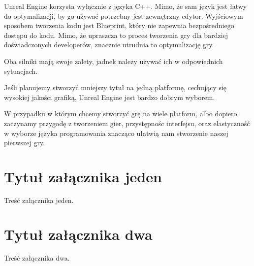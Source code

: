 \documentclass[brudnopis]{xmgr}
\begin{document}
Unreal Engine korzysta wyłącznie z języka C++. Mimo, że sam język jest łatwy do optymalizacji, by go używać potrzebny jest zewnętrzny edytor. Wyjściowym sposobem tworzenia kodu jest Blueprint, który nie zapewnia bezpośredniego dostępu do kodu. Mimo, że upraszcza to proces tworzenia gry dla bardziej doświadczonych developerów, znacznie utrudnia to optymalizację gry.

\summary
Oba silniki mają swoje zalety, jadnek należy używać ich w odpowiednich sytuacjach.

Jeśli planujemy stworzyć mniejszy tytuł na jedną platformę, cechujący się wysokiej jakości grafiką, Unreal Engine jest bardzo dobrym wyborem.

W przypadku w którym chcemy stworzyć grę na wiele platform, albo dopiero zaczynamy przygodę z tworzeniem gier, przystępnośc interfejsu, oraz elastyczność w wyborze języka programowania znacząco ułatwią nam stworzenie naszej pierwszej gry.

\appendix
\chapter{Tytuł załącznika jeden}

Treść załącznika jeden.

\chapter{Tytuł załącznika dwa}

Treść załącznika dwa.




\listoftables

\listoffigures

\oswiadczenie
\end{document}
